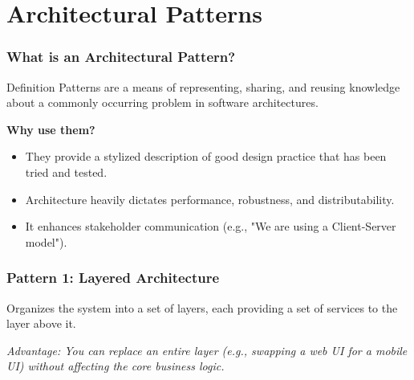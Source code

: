 \documentclass[xcolor=table]{beamer}
\begin{document}
\section{Architectural Patterns}

\begin{frame}
    \frametitle{What is an Architectural Pattern?}
    \begin{block}{Definition}
        Patterns are a means of representing, sharing, and reusing knowledge about a commonly occurring problem in software architectures.
    \end{block}
    \vspace{0.3cm}
    \textbf{Why use them?}
    \begin{itemize}
        \item They provide a stylized description of good design practice that has been tried and tested.
        \item Architecture heavily dictates performance, robustness, and distributability.
        \item It enhances stakeholder communication (e.g., "We are using a Client-Server model").
    \end{itemize}
\end{frame}

\begin{frame}[fragile]
    \frametitle{Pattern 1: Layered Architecture}
    Organizes the system into a set of layers, each providing a set of services to the layer above it.
    
    \vspace{0.3cm}
    \centering
    
    \vspace{0.2cm}
    \footnotesize \textit{Advantage: You can replace an entire layer (e.g., swapping a web UI for a mobile UI) without affecting the core business logic.}
\end{frame}
\end{document}
